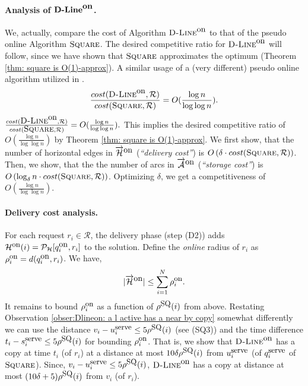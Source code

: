 \documentclass[11pt]{article}
\newcommand{\cost}[0]{cost}
\newcommand{\calH}{\mathcal{H}}
\newcommand{\calA}{\mathcal{A}}
\newcommand{\calR}{\mathcal{R}}
\newcommand{\calP}{\mathcal{P}}
\newcommand{\Square}[0]{\mbox{\sc Square}}
\newcommand{\rr}{r}
\newcommand{\NN}{N}
\newcommand{\bfDlineon}[0]{\mbox{{\bf D-Line}}^{\mbox{\bf on}}}
\newcommand{\Dlineon}[0]{\mbox{{\sc D-Line}}^{\mbox{\upshape on}}}
\newcommand{\Dron}[1]{{\rho}^{\mbox{\upshape\small on}}_{ #1}}
\newcommand{\DPHon}[0]{\calH^{\mbox{\upshape\small on}}}
\newcommand{\Dqon}{{q}^{\mbox{\upshape on}}}
\newcommand{\qSQ}{q^{\mbox{\small\upshape serve}}}
\newcommand{\uSQ}{u^{\mbox{\small\upshape serve}}}
\newcommand{\sSQ}{s^{\mbox{\small\upshape serve}}}
\newcommand{\ADon}[0]{\overrightarrow{\calA}^{\mbox{\upshape on}}}
\newcommand{\HDon}[0]{\overrightarrow{\calH}^{\mbox{\upshape on}}}
\newcommand{\rhoSQ}[0]{\rho^{\mbox{\small\upshape SQ}}}
\begin{document}
\paragraph*{\bf Analysis of $\bfDlineon$\commsingle.\commsingleend}
We, actually, compare the cost of Algorithm $\Dlineon$ to that of the pseudo online Algorithm $\Square$.
The desired competitive ratio for $\Dlineon$ will follow, since we have shown that $\Square$ approximates the optimum (Theorem \ref{thm: square is O(1)-approx}).
A similar usage of a (very different) pseudo online algorithm utilized in \cite{KK2014}.
\commlong
\begin{eqnarray*}
\frac{\cost(\Dlineon,\calR)}{\cost(\Square,\calR)}=O(\frac{\log n}{\log \log n}).
\end{eqnarray*}
\commlongend
\commshort
$
\frac{\cost(\Dlineon,\calR)}{\cost(\Square,\calR)}=O(\frac{\log n}{\log \log n}).
$
\commshortend
This implies the desired competitive ratio of $O(\frac{\log n}{\log \log n})$ by
Theorem \ref{thm: square is O(1)-approx}.
We first show,
that the number of horizontal edges in $\HDon$ ({\em``delivery cost''}) is $O\left(\delta\cdot\cost(\Square,\calR)\right)$.
Then, we show,
that the the number of arcs in $\ADon$ ({\em``storage cost''}) is $O\left(\log_\delta n\cdot\cost(\Square,\calR)\right)$.
Optimizing $\delta$, we get a competitiveness of $O(\frac{\log n}{\log \log n})$.

\commsingle
\commsingleend
\vspace{-0.2cm}
\paragraph{\bf Delivery cost analysis.}



For each request $\rr_i\in\calR$, the delivery phase (step (D2)) adds $\DPHon(i)=\calP_\calH[\Dqon_i,\rr_i]$
to the solution.
Define the {\em online} radius of $\rr_i$ as $\Dron{i}=d(\Dqon_i,\rr_i)$.
We have,
\vspace{-0.3cm}
\begin{eqnarray}
|\HDon|\leq \sum_{i=1}^{\NN} \Dron{i}.
\label{Ineq: |Hon| leq sum Dron(i)}
\end{eqnarray}
It remains to bound $\Dron{i}$ as a function of $\rhoSQ(i)$ from above.
Restating Observation \ref{obser:Dlineon: a l active has a near by copy} somewhat differently
we can use the distance
$v_i-\uSQ_i \leq 5\rhoSQ(i)$ (see (SQ3)) and the time difference $t_i-\sSQ_i\leq 5\rhoSQ(i)$ for bounding $\Dron{i}$.
That is, we show that $\Dlineon$ has a copy at time $t_i$ (of $\rr_i$) at a distance at most $10\delta\rhoSQ(i)$ from $\uSQ_i$ (of $\qSQ_i$ of $\Square$).
Since, $v_i-\uSQ_i\leq 5\rhoSQ(i)$, $\Dlineon$ has a copy at distance at most $(10\delta+5)\rhoSQ(i)$ from $v_i$ (of $\rr_i$).
\end{document}
